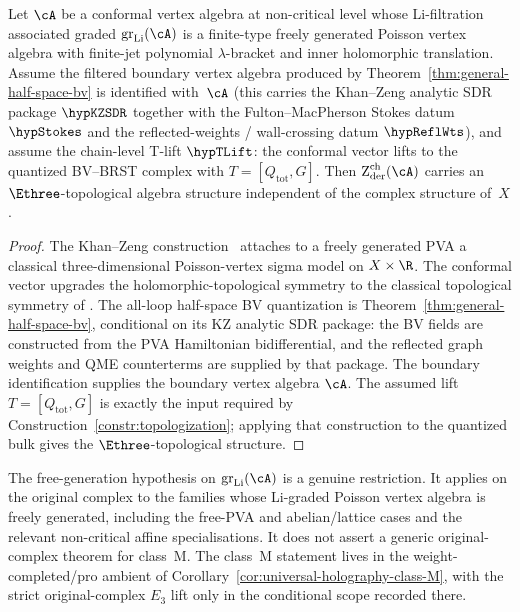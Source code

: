 \begin{theorem}\label{thm:E3-topological-free-PVA}
Let $\cA$ be a conformal vertex algebra at non-critical level
whose Li-filtration associated graded $\operatorname{gr}_{\mathrm{Li}}(\cA)$
is a finite-type freely generated Poisson vertex algebra with
finite-jet polynomial $\lambda$-bracket and inner holomorphic
translation. Assume the filtered boundary vertex algebra produced by
Theorem~\ref{thm:general-half-space-bv} is identified with~\(\cA\)
(this carries the Khan--Zeng analytic SDR package $\hypKZSDR$ together
with the Fulton--MacPherson Stokes datum $\hypStokes$ and the
reflected-weights / wall-crossing datum $\hypReflWts$), and assume
the chain-level T-lift $\hypTLift$: the conformal vector lifts to
the quantized BV--BRST complex with $T=[Q_{\mathrm{tot}},G]$.
Then $\Zder^{\mathrm{ch}}(\cA)$ carries an
$\Ethree$-topological algebra structure independent of the complex
structure of~$X$.
\end{theorem}

\begin{proof}
The Khan--Zeng construction~\cite{KZ25} attaches to a freely
generated PVA a classical three-dimensional Poisson-vertex sigma model
on $X \times \R$. The conformal vector upgrades the
holomorphic-topological symmetry to the classical topological symmetry
of \cite[Theorem~4.1]{KZ25}. The all-loop half-space BV quantization
is Theorem~\ref{thm:general-half-space-bv}, conditional on its KZ
analytic SDR package: the BV fields are constructed from the PVA
Hamiltonian bidifferential, and the reflected graph weights and QME
counterterms are supplied by that package.
The boundary identification supplies the boundary vertex algebra
\(\cA\). The assumed lift $T=[Q_{\mathrm{tot}},G]$ is exactly the
input required by Construction~\ref{constr:topologization}; applying
that construction to the quantized bulk gives the
$\Ethree$-topological structure.
\end{proof}

\begin{remark}
\label{rem:E3-top-free-PVA-scope}
The free-generation hypothesis on $\operatorname{gr}_{\mathrm{Li}}(\cA)$
is a genuine restriction. It applies on the original complex to the
families whose Li-graded Poisson vertex algebra is freely generated,
including the free-PVA and abelian/lattice cases and the relevant
non-critical affine specialisations. It does not assert a generic
original-complex theorem for class~M. The class~M statement lives in
the weight-completed/pro ambient of
Corollary~\ref*{cor:universal-holography-class-M}, with the strict
original-complex $E_3$ lift only in the conditional scope recorded
there.
\end{remark}

